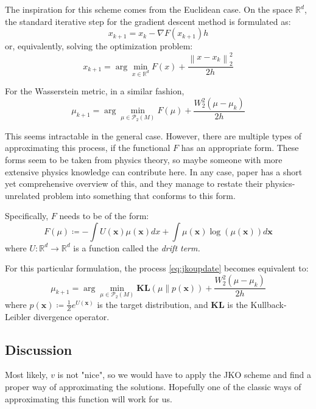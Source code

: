 \documentclass{article}
\newcommand{\norm}[1]{\left\lVert#1\right\rVert}
\begin{document}
The inspiration for this scheme comes from the Euclidean case. On the 
space $\mathbb{R}^d$, the standard iterative step for the gradient 
descent method is formulated as:
\[x_{k+1} = x_k - \nabla F(x_{k+1})h \]
or, equivalently, solving the optimization problem:
\[x_{k+1} = \arg\min_{x\in \mathbb{R}^d} F(x)+ \frac{\norm{x - x_k}_2^2}{2h} \]

For the Wasserstein metric, in a similar fashion, 
\begin{equation}
    \label{eq:jkoupdate}
    \mu_{k+1} = \arg\min_{\mu\in\mathscr{P}_2(M)} F(\mu)+ \frac{W_2^2(\mu - \mu_k)}{2h}
\end{equation}

This seems intractable in the general case. However, there are multiple
types of approximating this process, if the functional $F$ has an appropriate 
form. These forms seem to be taken from physics theory, so maybe someone 
with more extensive physics knowledge can contribute here. In any case,
paper \cite{zhang2018policy} has a short yet comprehensive overview of this,
and they manage to restate their physics-unrelated problem into something 
that conforms to this form.

Specifically, $F$ needs to be of the form:
\[F(\mu)\coloneqq -\int U(\mathbf{x})\mu(\mathbf{x})dx + \int
\mu(\mathbf{x})\log(\mu(\mathbf{x}))d\mathbf{x} \]
where $U:\mathbb{R}^d\rightarrow \mathbb{R}^d$ is a function called the 
\textit{drift term.}

For this particular formulation, the process \ref{eq:jkoupdate} becomes 
equivalent to:
\[\mu_{k+1} = \arg\min_{\mu\in\mathscr{P}_2(M)} \mathbf{KL}(\mu\parallel p(\mathbf{x}))+ \frac{W_2^2(\mu - \mu_k)}{2h} \]
where $p(\mathbf{x})\coloneqq \frac{1}{Z}e^{U(\mathbf{x})}$ is the target 
distribution, and $\mathbf{KL}$ is the Kullback-Leibler divergence operator.

\subsection{Discussion}

Most likely, $v$ is not "nice", so we would have to apply the JKO scheme
and find a proper way of approximating the solutions. Hopefully one of 
the classic ways of approximating this function will work for us.



\end{document}
